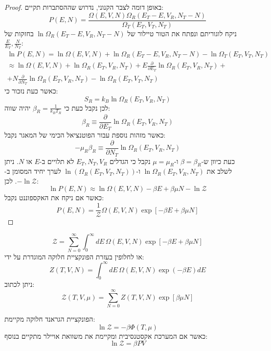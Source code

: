 \documentclass{tstextbook}
\begin{document}
\begin{proof}
באופן דומה לצבר הקנוני, נדרוש שההסתברות תקיים:
$$P(E,N)=\frac{\Omega(E,V,N)\Omega_{R}(E_{T}-E,V_{R},N_{T}-N)}{\Omega_{T}(E_{T},V_{T},N_{T})}$$
ניקח לוגוריתם ונפתח את הטור טיילור של \(\ln \Omega_{R}(E_{T}-E, V_{R},N_{T}-N)\) בחזקות של \(\frac{E}{E_{T}},\frac{N}{N_{T}}\):
$$\begin{gather}\ln P(E,N)=\ln\Omega(E,V,N)+\ln\Omega_{R}(E_{T}-E,V_{R},N_{T}-N)-\ln\Omega_{T}(E_{T},V_{T},N_{T})  \\\approx\ln\Omega(E,V,N)+\ln\Omega_{R}(E_{T},V_{R},N_{T})+E\frac{\partial}{\partial E_{T}}\ln\Omega_{R}(E_{T},V_{R},N_{T})+ \\+N\frac{\partial}{\partial N_{T}}\ln\Omega_{R}(E_{T},V_{R},N_{T})-\ln\Omega_{R}(E_{T},V_{T},N_{T})
\end{gather}$$
כאשר כעת נזכור כי:
$$S_{R}=k_{B}\ln\Omega_{R}(E_{T},V_{R},N_{T})$$
לכן נקבל כעת כי \(\beta_{R}=\frac{1}{k_{B}T_{R}}\) יהיה שווה:
$$\beta_{R}\equiv\frac{\partial}{\partial E_{T}}\ln\Omega_{R}(E_{T},V_{R},N_{T})$$
כאשר מזהות נוספת עבור הפוטנציאל הכימי של המאגר נקבל:
$$-\mu_{R}\beta_{R}\equiv\frac{\partial}{\partial N_{T}}\ln\Omega_{R}(E_{T},V_{R},N_{T})$$
כעת כיוון ש-\(\beta=\beta_{R}\) ו-\(\mu=\mu_{R}\) נקבל כי הגדלים \(E_{T},N_{T},V_{R}\) לא תלויים ב-\(E\) או \(N\). ניתן לשלב את \(\ln \Omega_{R}(E_{T},V_{R},N_{T})\) ו-\(\ln\left( \Omega_{R}(E_{T}, V_{T},N_{T}) \right)\) לערך יחיד המסומן ב-\(-\ln \mathcal{Z}\). לכן:
$$\ln P(E,N)\approx\ln\Omega(E,V,N)-\beta E+\beta\mu N-\ln{\mathcal{Z}}$$
כאשר אם ניקח את האקספוננט נקבל:
$$P(E,N)=\frac{1}{\mathcal{Z}}\Omega(E,V,N)\exp\left[-\beta E+\beta\mu N\right]$$

\end{proof}
\begin{corollary}
$${\mathcal{Z}}=\sum_{N=0}^{\infty}\int_{0}^{\infty}d E\,\Omega(E,V,N)\exp\left[-\beta E+\beta\mu N\right]$$
או לחלופין בעזרת הפונקציית חלוקה המוגדרת על ידי:
$$Z(T,V,N)=\int_{0}^{\infty}d E\,\Omega(E,V,N)\exp(-\beta E)d E$$
ניתן לכתוב:
$${\mathcal{Z}}(T,V,\mu)=\sum_{N=0}^{\infty}Z(T,V,N)\exp\left[\beta\mu N\right]$$

\end{corollary}
\begin{proposition}
הפונקציית הגראנד חלוקה מקיימת:
$$\ln \mathcal{Z} = -\beta \Phi\left( T,\mu \right)$$
כאשר אם המערכת אקסטנסיבית ומקיימת את משוואת אויילר מתקיים בנוסף:
$$\ln \mathcal{Z} = \beta PV$$

\end{proposition}
\end{document}

